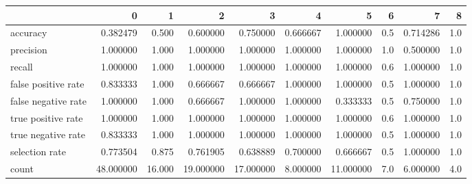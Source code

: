 \begin{tabular}{lrrrrrrrrr}
\toprule
{} &          0 &       1 &          2 &          3 &         4 &          5 &    6 &         7 &    8 \\
\midrule
accuracy            &   0.382479 &   0.500 &   0.600000 &   0.750000 &  0.666667 &   1.000000 &  0.5 &  0.714286 &  1.0 \\
precision           &   1.000000 &   1.000 &   1.000000 &   1.000000 &  1.000000 &   1.000000 &  1.0 &  0.500000 &  1.0 \\
recall              &   1.000000 &   1.000 &   1.000000 &   1.000000 &  1.000000 &   1.000000 &  0.6 &  1.000000 &  1.0 \\
false positive rate &   0.833333 &   1.000 &   0.666667 &   0.666667 &  1.000000 &   1.000000 &  0.5 &  1.000000 &  1.0 \\
false negative rate &   1.000000 &   1.000 &   0.666667 &   1.000000 &  1.000000 &   0.333333 &  0.5 &  0.750000 &  1.0 \\
true positive rate  &   1.000000 &   1.000 &   1.000000 &   1.000000 &  1.000000 &   1.000000 &  0.6 &  1.000000 &  1.0 \\
true negative rate  &   0.833333 &   1.000 &   1.000000 &   1.000000 &  1.000000 &   1.000000 &  0.5 &  1.000000 &  1.0 \\
selection rate      &   0.773504 &   0.875 &   0.761905 &   0.638889 &  0.700000 &   0.666667 &  0.5 &  1.000000 &  1.0 \\
count               &  48.000000 &  16.000 &  19.000000 &  17.000000 &  8.000000 &  11.000000 &  7.0 &  6.000000 &  4.0 \\
\bottomrule
\end{tabular}

